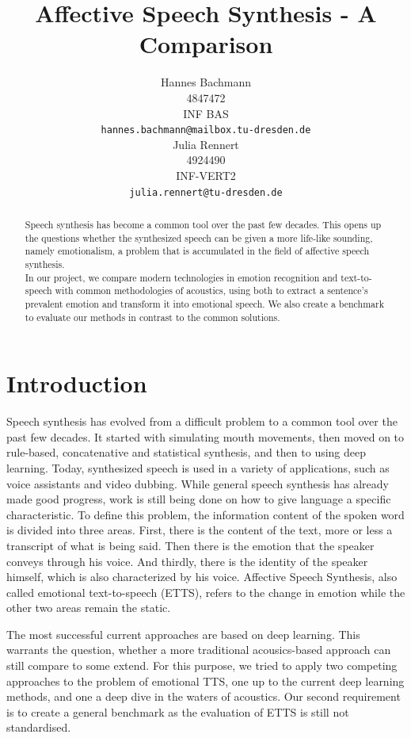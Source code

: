 \documentclass[11pt]{article}
\title{Affective Speech Synthesis - A Comparison}
\author{Hannes Bachmann\\
  4847472\\
  INF BAS \\
  \texttt{\small hannes.bachmann@mailbox.tu-dresden.de}
  \\ \And
  Julia Rennert \\
  4924490\\
  INF-VERT2 \\
  \texttt{\small julia.rennert@tu-dresden.de}
  }
\begin{document}
\maketitle
\begin{abstract}
Speech synthesis has become a common tool over the past few decades. This opens up the questions whether the synthesized speech can be given a more life-like sounding, namely emotionalism, a problem that is accumulated in the field of affective speech synthesis. \\
In our project, we compare modern technologies in emotion recognition and text-to-speech with common methodologies of acoustics, using both to extract a sentence's prevalent emotion and transform it into emotional speech. We also create a benchmark to evaluate our methods in contrast to the common solutions.
\end{abstract}

\section{Introduction}
Speech synthesis has evolved from a difficult problem to a common tool over the past few decades.
It started with simulating mouth movements, then moved on to rule-based, concatenative and
statistical synthesis, and then to using deep learning. Today, synthesized speech is used in a
variety of applications, such as voice assistants and video dubbing.
While general speech synthesis has already made good progress, work is still being done on
how to give language a specific characteristic. To define this problem, the information content of
the spoken word is divided into three areas. First, there is the content of the text, more or less
a transcript of what is being said. Then there is the emotion that the speaker conveys through
his voice. And thirdly, there is the identity of the speaker himself, which is also characterized by
his voice. Affective Speech Synthesis, also called emotional text-to-speech (ETTS), refers to the change in emotion while the other two areas remain the static.

The most successful current approaches are based on deep learning\cite{triantafyllopoulos_overview_2023, cho_multi-speaker_2021, diatlova_emospeech_2023}. This warrants the question, whether a more traditional acousics-based approach can still compare to some extend. For this purpose, we tried to apply two competing approaches to the problem of emotional TTS, one up to the current deep learning methods, and one a deep dive in the waters of acoustics. Our second requirement is to create a general benchmark as the evaluation of ETTS is still not standardised.
\end{document}
